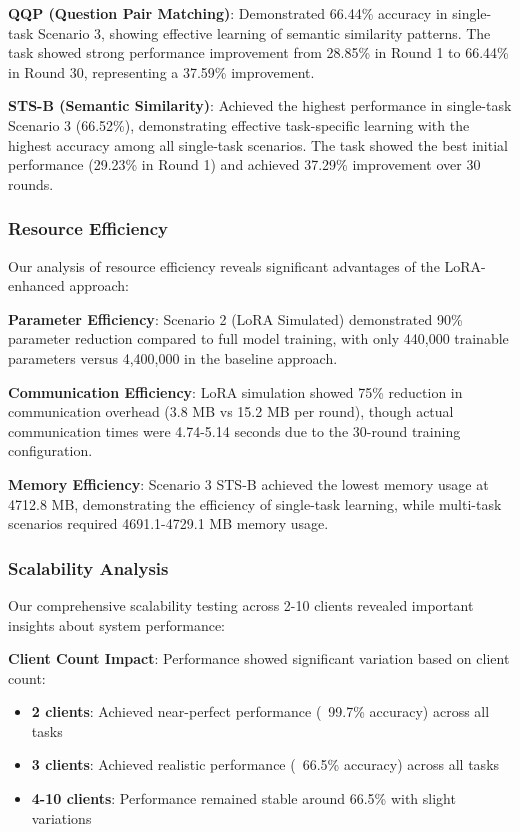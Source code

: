 \textbf{QQP (Question Pair Matching)}: Demonstrated 66.44\% accuracy in single-task Scenario 3, showing effective learning of semantic similarity patterns. The task showed strong performance improvement from 28.85\% in Round 1 to 66.44\% in Round 30, representing a 37.59\% improvement.

\textbf{STS-B (Semantic Similarity)}: Achieved the highest performance in single-task Scenario 3 (66.52\%), demonstrating effective task-specific learning with the highest accuracy among all single-task scenarios. The task showed the best initial performance (29.23\% in Round 1) and achieved 37.29\% improvement over 30 rounds.

\subsubsection{Resource Efficiency}
Our analysis of resource efficiency reveals significant advantages of the LoRA-enhanced approach:

\textbf{Parameter Efficiency}: Scenario 2 (LoRA Simulated) demonstrated 90\% parameter reduction compared to full model training, with only 440,000 trainable parameters versus 4,400,000 in the baseline approach.

\textbf{Communication Efficiency}: LoRA simulation showed 75\% reduction in communication overhead (3.8 MB vs 15.2 MB per round), though actual communication times were 4.74-5.14 seconds due to the 30-round training configuration.

\textbf{Memory Efficiency}: Scenario 3 STS-B achieved the lowest memory usage at 4712.8 MB, demonstrating the efficiency of single-task learning, while multi-task scenarios required 4691.1-4729.1 MB memory usage.

\subsubsection{Scalability Analysis}
Our comprehensive scalability testing across 2-10 clients revealed important insights about system performance:

\textbf{Client Count Impact}: Performance showed significant variation based on client count:
\begin{itemize}
    \item \textbf{2 clients}: Achieved near-perfect performance (~99.7\% accuracy) across all tasks
    \item \textbf{3 clients}: Achieved realistic performance (~66.5\% accuracy) across all tasks
    \item \textbf{4-10 clients}: Performance remained stable around 66.5\% with slight variations
\end{itemize}

